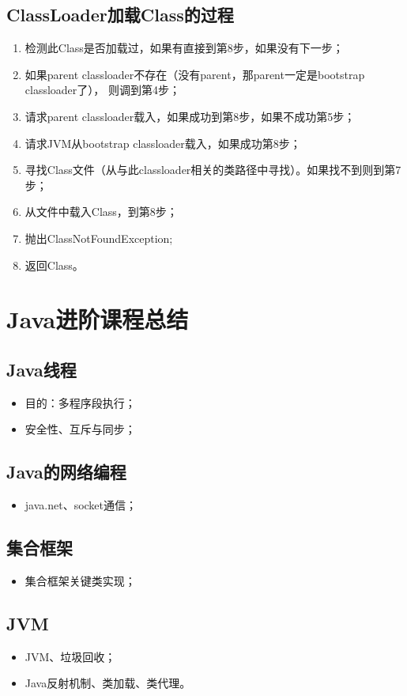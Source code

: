 \subsection{ClassLoader加载Class的过程}
\begin{enumerate}
	\item 检测此Class是否加载过，如果有直接到第8步，如果没有下一步；
	\item 如果parent classloader不存在（没有parent，那parent一定是bootstrap classloader了），
	则调到第4步；
	\item 请求parent classloader载入，如果成功到第8步，如果不成功第5步；
	\item 请求JVM从bootstrap classloader载入，如果成功第8步；
	\item 寻找Class文件（从与此classloader相关的类路径中寻找）。如果找不到则到第7步；
	\item 从文件中载入Class，到第8步；
	\item 抛出ClassNotFoundException;
	\item 返回Class。
\end{enumerate}

\section{Java进阶课程总结}
\subsection{Java线程}
\begin{itemize}
	\item 目的：多程序段执行；
	\item 安全性、互斥与同步；
\end{itemize}
\subsection{Java的网络编程}
\begin{itemize}
	\item java.net、socket通信；
\end{itemize}
\subsection{集合框架}
\begin{itemize}
	\item 集合框架关键类实现；
\end{itemize}
\subsection{JVM}
\begin{itemize}
	\item JVM、垃圾回收；
	\item Java反射机制、类加载、类代理。
\end{itemize}